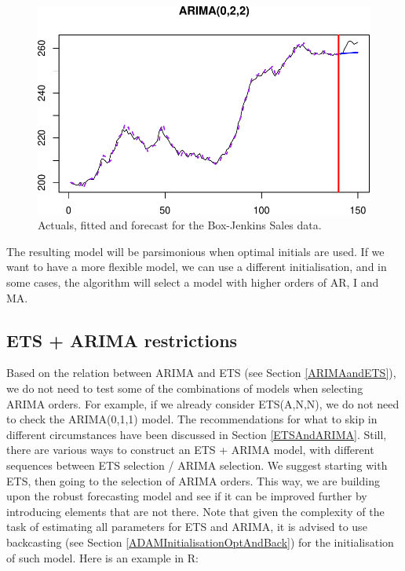 \documentclass[]{book}
\theoremstyle{definition}
\theoremstyle{definition}
\theoremstyle{definition}
\theoremstyle{definition}
\theoremstyle{remark}
\begin{document}
\begin{figure}
\centering
\includegraphics{Svetunkov--2022----ADAM_files/figure-latex/adamARIMAModelFitExample-1.pdf}
\caption{\label{fig:adamARIMAModelFitExample}Actuals, fitted and forecast for the Box-Jenkins Sales data.}
\end{figure}

The resulting model will be parsimonious when optimal initials are used. If we want to have a more flexible model, we can use a different initialisation, and in some cases, the algorithm will select a model with higher orders of AR, I and MA.

\hypertarget{ets-arima-restrictions}{%
\subsection{ETS + ARIMA restrictions}\label{ets-arima-restrictions}}

Based on the relation between ARIMA and ETS (see Section \ref{ARIMAandETS}), we do not need to test some of the combinations of models when selecting ARIMA orders. For example, if we already consider ETS(A,N,N), we do not need to check the ARIMA(0,1,1) model. The recommendations for what to skip in different circumstances have been discussed in Section \ref{ETSAndARIMA}. Still, there are various ways to construct an ETS + ARIMA model, with different sequences between ETS selection / ARIMA selection. We suggest starting with ETS, then going to the selection of ARIMA orders. This way, we are building upon the robust forecasting model and see if it can be improved further by introducing elements that are not there. Note that given the complexity of the task of estimating all parameters for ETS and ARIMA, it is advised to use backcasting (see Section \ref{ADAMInitialisationOptAndBack}) for the initialisation of such model. Here is an example in R:
\end{document}
